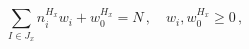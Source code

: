 \begin{equation} \label{Kacond_sub}
\sum_{I\in J_x} n_i^{H_x} w_i + w_0^{H_x} = N\,, \quad
w_i, w_0^{H_x} \ge 0\,,
\end{equation}

